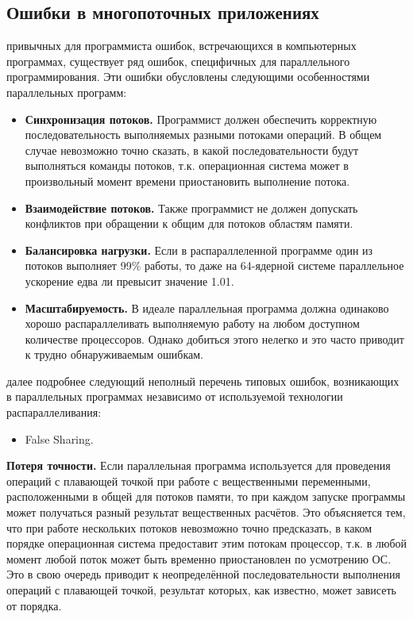 { %
	\subsection{Ошибки в многопоточных приложениях}
	 привычных для программиста ошибок, встречающихся в компьютерных программах, существует ряд ошибок, специфичных для параллельного программирования. Эти ошибки обусловлены следующими особенностями параллельных программ: 
	\begin{itemize}
		\item\textbf{Синхронизация потоков.} Программист должен обеспечить корректную последовательность выполняемых разными потоками операций. В общем случае невозможно точно сказать, в какой последовательности будут выполняться команды потоков, т.к. операционная система может в произвольный момент времени приостановить выполнение потока.
		\item\textbf{Взаимодействие потоков.} Также программист не должен допускать конфликтов при обращении к общим для потоков областям памяти. 
		\item\textbf{Балансировка нагрузки.} Если в распараллеленной программе один из потоков выполняет 99\% работы, то даже на 64-ядерной системе параллельное ускорение едва ли превысит значение 1.01.
		\item\textbf{Масштабируемость.} В идеале параллельная программа должна одинаково хорошо распараллеливать выполняемую работу на любом доступном количестве процессоров. Однако добиться этого нелегко и это часто приводит к трудно обнаруживаемым ошибкам.
	\end{itemize}
	 далее подробнее следующий неполный перечень типовых ошибок, возникающих в параллельных программах независимо от используемой технологии распараллеливания:
	\begin{itemize}
		 точности операций с плавающей точкой.
		 блокировки (deadlock).
		 гонки (race conditions). 
		 АВА.
		 приоритетов.
		(starvation).
		\item False Sharing.
	\end{itemize}
	\par\textbf{Потеря точности.} Если параллельная программа используется для проведения операций с плавающей точкой при работе с вещественными  переменными, расположенными в общей для потоков памяти, то при каждом запуске программы может получаться разный результат вещественных расчётов. Это объясняется тем, что при работе нескольких потоков невозможно точно предсказать, в каком порядке операционная система предоставит этим потокам процессор, т.к. в любой момент любой поток может быть временно приостановлен по усмотрению ОС. Это в свою очередь приводит к неопределённой последовательности выполнения операций с плавающей точкой, результат которых, как известно, может зависеть от порядка.
}
